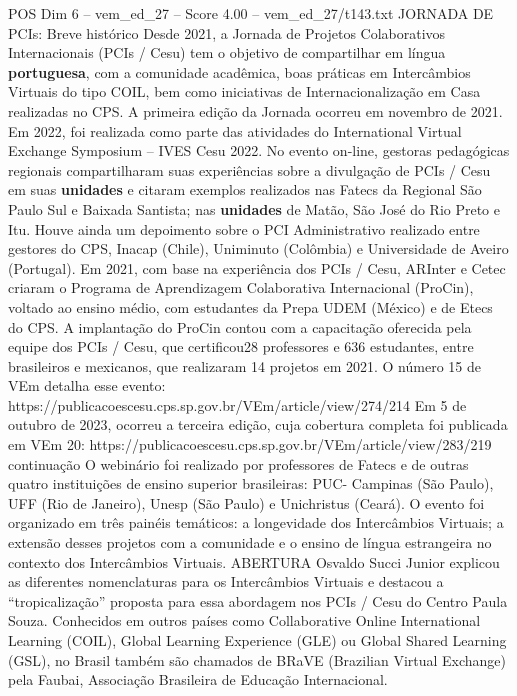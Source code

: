\begin{textsample}{POS Dim 6 – vem\_ed\_27 – Score 4.00 – vem\_ed\_27/t143.txt}  \label{ex:f6_pos_149}
JORNADA DE PCIs: Breve histórico Desde 2021, a Jornada de Projetos Colaborativos Internacionais (PCIs / Cesu) tem o objetivo de compartilhar em língua \textbf{portuguesa}, com a comunidade acadêmica, boas práticas em Intercâmbios Virtuais do tipo COIL, bem como iniciativas de Internacionalização em Casa realizadas no CPS.
A primeira edição da Jornada ocorreu em novembro de 2021.
Em 2022, foi realizada como parte das atividades do International Virtual Exchange Symposium – IVES Cesu 2022.
No evento on-line, gestoras pedagógicas regionais compartilharam suas experiências sobre a divulgação de PCIs / Cesu em suas \textbf{unidades} e citaram exemplos realizados nas Fatecs da Regional São Paulo Sul e Baixada Santista; nas \textbf{unidades} de Matão, São José do Rio Preto e Itu.
Houve ainda um depoimento sobre o PCI Administrativo realizado entre gestores do CPS, Inacap (Chile), Uniminuto (Colômbia) e Universidade de Aveiro (Portugal).
Em 2021, com base na experiência dos PCIs / Cesu, ARInter e Cetec criaram o Programa de Aprendizagem Colaborativa Internacional (ProCin), voltado ao ensino médio, com estudantes da Prepa UDEM (México) e de Etecs do CPS.
A implantação do ProCin contou com a capacitação oferecida pela equipe dos PCIs / Cesu, que certificou28 professores e 636 estudantes, entre brasileiros e mexicanos, que realizaram 14 projetos em 2021.
O número 15 de VEm detalha esse evento: https://publicacoescesu.cps.sp.gov.br/VEm/article/view/274/214 Em 5 de outubro de 2023, ocorreu a terceira edição, cuja cobertura completa foi publicada em VEm 20: https://publicacoescesu.cps.sp.gov.br/VEm/article/view/283/219 continuação O webinário foi realizado por professores de Fatecs e de outras quatro instituições de ensino superior brasileiras: PUC- Campinas (São Paulo), UFF (Rio de Janeiro), Unesp (São Paulo) e Unichristus (Ceará).
O evento foi organizado em três painéis temáticos: a longevidade dos Intercâmbios Virtuais; a extensão desses projetos com a comunidade e o ensino de língua estrangeira no contexto dos Intercâmbios Virtuais.
ABERTURA Osvaldo Succi Junior explicou as diferentes nomenclaturas para os Intercâmbios Virtuais e destacou a “tropicalização” proposta para essa abordagem nos PCIs / Cesu do Centro Paula Souza.
Conhecidos em outros países como Collaborative Online International Learning (COIL), Global Learning Experience (GLE) ou Global Shared Learning (GSL), no Brasil também são chamados de BRaVE (Brazilian Virtual Exchange) pela Faubai, Associação Brasileira de Educação Internacional.

\end{textsample}
